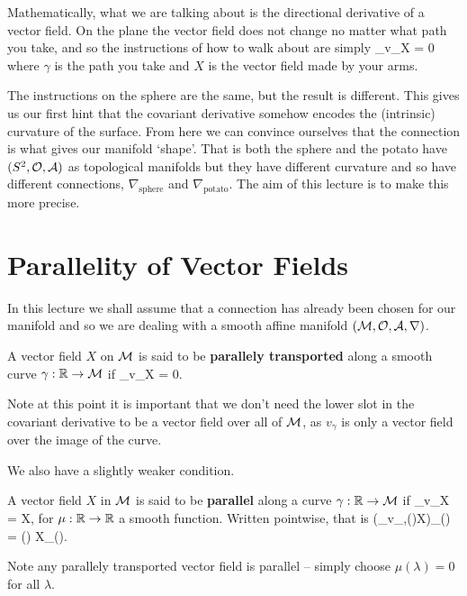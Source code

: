 Mathematically, what we are talking about is the directional derivative of a vector field. On the plane the vector field does not change no matter what path you take, and so the instructions of how to walk about are simply
\bse 
    \nabla_{v_{\gamma}}X = 0
\ese 
where $\gamma$ is the path you take and $X$ is the vector field made by your arms. 

The instructions on the sphere are the same, but the result is different. This gives us our first hint that the covariant derivative somehow encodes the (intrinsic) curvature of the surface. From here we can convince ourselves that the connection is what gives our manifold `shape'. That is both the sphere and the potato have $(S^2,\mathcal{O},\mathcal{A})$ as topological manifolds but they have different curvature and so have different connections, $\nabla_{\text{sphere}}$ and $\nabla_{\text{potato}}$. The aim of this lecture is to make this more precise. 

\section{Parallelity of Vector Fields}

In this lecture we shall assume that a connection has already been chosen for our manifold and so we are dealing with a smooth affine manifold $(\mathcal{M},\mathcal{O},\mathcal{A},\nabla)$.

    A vector field $X$ on $\mathcal{M}$ is said to be \textbf{parallely transported} along a smooth curve $\gamma:\mathbb{R}\to\mathcal{M}$ if 
    \bse 
        \nabla_{v_{\gamma}}X = 0.
    \ese 
\ed 

\br 
    Note at this point it is important that we don't need the lower slot in the covariant derivative to be a vector field over all of $\mathcal{M}$, as $v_{\gamma}$ is only a vector field over the image of the curve.
\er 

We also have a slightly weaker condition.

\bd[Parallel] 
    A vector field $X$ in $\mathcal{M}$ is said to be \textbf{parallel} along a curve $\gamma:\mathbb{R}\to\mathcal{M}$ if
    \bse 
        \nabla_{v_{\gamma}}X = \mu \cdot X,
    \ese 
    for $\mu:\mathbb{R}\to\mathbb{R}$ a smooth function. Written pointwise, that is
    \bse 
        \big(\nabla_{v_{\gamma,\gamma(\lambda)}}X\big)_{\gamma(\lambda)} = \mu(\lambda) \cdot X_{\gamma(\lambda)}.
    \ese 
\ed 

Note any parallely transported vector field is parallel -- simply choose $\mu(\lambda)=0$ for all $\lambda$.

